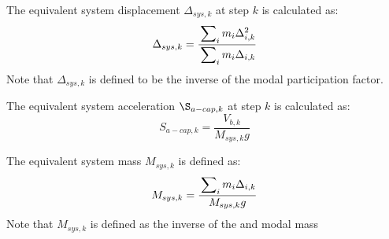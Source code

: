 The equivalent system displacement $\Delta_{sys,k}$ at step $k$ is calculated as:
\begin{equation}
	\Delta_{sys,k} = \frac{\sideset{}{_i}\sum m_i \Delta_{i,k}^2}{\sideset{}{_i}\sum m_i \Delta_{i,k}}
\end{equation}
Note that $\Delta_{sys,k}$ is defined to be the inverse of the modal participation factor.

The equivalent system acceleration $\S_{a-cap,k}$ at step $k$ is calculated as:
\begin{equation}
	S_{a-cap,k} = \frac{V_{b,k}}{M_{sys,k} g}
\end{equation}

The equivalent system mass $M_{sys,k}$ is defined as:
\begin{equation}
	M_{sys,k} = \frac{\sideset{}{_i}\sum m_i \Delta_{i,k}}{M_{sys,k} g}
\end{equation}
Note that $M_{sys,k}$ is defined as the inverse of the and modal mass